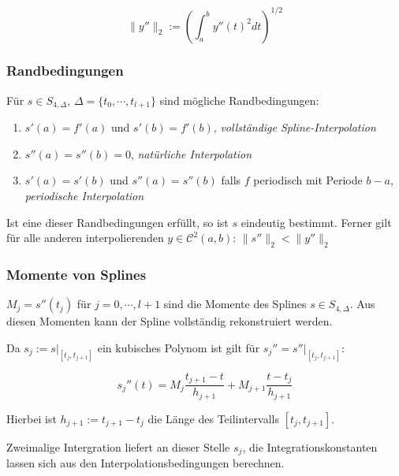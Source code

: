 $$\|y''\|_2 := \left(\int_a^b y''(t)^2 dt\right)^{1/2}$$

\subsubsection*{Randbedingungen}

Für $s \in S_{4,\Delta}$, $\Delta = \{t_0,\cdots,t_{l+1}\}$ sind mögliche Randbedingungen:

\begin{enumerate}[label=(\alph*)]
	\item $s'(a) = f'(a)$ und $s'(b)=f'(b)$, \emph{vollständige Spline-Interpolation}
	\item $s''(a) = s''(b) = 0$, \emph{natürliche Interpolation}
	\item $s'(a) = s'(b)$ und $s''(a) = s''(b)$ falls $f$ periodisch mit Periode $b-a$, \emph{periodische Interpolation}
\end{enumerate}

Ist eine dieser Randbedingungen erfüllt, so ist $s$ eindeutig bestimmt. Ferner gilt für alle anderen interpolierenden $y \in \mathcal{C}^2(a,b)$: $\|s''\|_2 < \|y''\|_2$

\subsubsection*{Momente von Splines}

$M_j = s''(t_j)$ für $j = 0, \cdots, l+1$ sind die Momente des Splines $s \in S_{4,\Delta}$. Aus diesen Momenten kann der Spline vollständig rekonstruiert werden.

Da $s_j := s|_{[t_j,t_{j+1}]}$ ein kubisches Polynom ist gilt für $s_j'' = s''|_{[t_j,t_{j+1}]}$:

$$s_j''(t) = M_j \frac{t_{j+1}-t}{h_{j+1}} + M_{j+1} \frac{t-t_j}{h_{j+1}}$$

Hierbei ist $h_{j+1} := t_{j+1} - t_j$ die Länge des Teilintervalls $[t_j,t_{j+1}]$.

Zweimalige Intergration liefert an dieser Stelle $s_j$, die Integrationskonstanten lassen sich aus den Interpolationsbedingungen berechnen.

